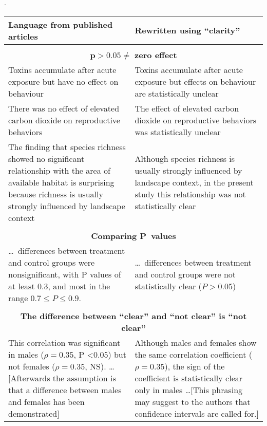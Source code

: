 
\setlength\tabcolsep{1cm}.
\begin{tabular}{p{7.0cm}p{7.0cm}}
Language from published articles & Rewritten using ``clarity'' \\
\hline\\

\multicolumn{2}{c}{$\mathbf{p > 0.05 \neq}$ \textbf{zero effect}} \\

Toxins accumulate after acute exposure but have no effect on behaviour
& Toxins accumulate after acute exposure but effects on behaviour are statistically unclear
\\

There was no effect of elevated carbon dioxide on reproductive behaviors 
& The effect of elevated carbon dioxide on reproductive behaviors was statistically unclear
\\

The finding that species richness showed no significant relationship with the area of available habitat is surprising because richness is usually strongly influenced by landscape context 
& Although species richness is usually strongly influenced by landscape context, in the present study this relationship was not statistically clear 
\\ \\

\multicolumn{2}{c}{\textbf{Comparing P~values}}
\\

\ldots\ differences between treatment and control groups were nonsignificant, with P values of at least 0.3, and most in the range $0.7 \leq P \leq 0.9$.
& \ldots\ differences between treatment and control groups were not statistically clear ($P > 0.05$)
\\ \\

\multicolumn{2}{c}{\textbf{The difference between ``clear'' and ``not clear'' is ``not clear''}}
\\

This correlation was significant in males ($\rho=0.35$, P \textless 0.05) but not females ($\rho=0.35$, NS). \ldots [Afterwards the assumption is that a difference between males and females has been demonstrated]
& Although males and females show the same correlation coefficient ($\rho=0.35$), the sign of the coefficient is statistically clear only in males  \ldots [This phrasing may suggest to the authors that confidence intervals are called for.] 
\\


\end{tabular}
